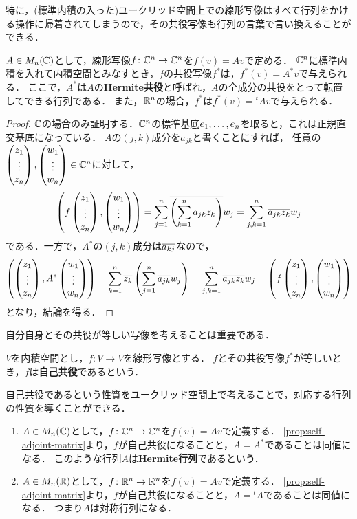 特に，(標準内積の入った)ユークリッド空間上での線形写像はすべて行列をかける操作に帰着されてしまうので，その共役写像も行列の言葉で言い換えることができる．
\begin{prop}\label{prop:self-adjoint-matrix}
  $A \in M_n(\mathbb{C})$として，線形写像$f \colon \mathbb{C}^n \to \mathbb{C}^n$を$f(v) = Av$で定める．
  $\mathbb{C}^n$に標準内積を入れて内積空間とみなすとき，$f$の共役写像$f^\ast$は，$f^\ast(v) = A^\ast v$で与えられる．
  ここで，$A^\ast$は$A$の\textbf{Hermite共役}と呼ばれ，$A$の全成分の共役をとって転置してできる行列である．
  また，$\mathbb{R}^n$の場合，$f^\ast$は$f^\ast(v) = {}^tA v$で与えられる．
\end{prop}
\begin{proof}
$\mathbb{C}$の場合のみ証明する．$\mathbb{C}^n$の標準基底$e_{1},\dots,e_{n}$を取ると，これは正規直交基底になっている．
$A$の$(j,k)$成分を$a_{jk}$と書くことにすれば，
任意の$\begin{pmatrix} z_{1} \\ \vdots \\ z_{n} \end{pmatrix}, \begin{pmatrix} w_{1} \\ \vdots \\ w_{n} \end{pmatrix} \in \mathbb{C}^n$に対して，
\[
  \left( f \begin{pmatrix} z_{1} \\ \vdots \\ z_{n} \end{pmatrix}, \begin{pmatrix} w_{1} \\ \vdots \\ w_{n} \end{pmatrix} \right) = \sum_{j=1}^{n} \overline{\left( \sum_{k=1}^{n} a_{jk}z_k\right)} w_j 
  = \sum_{j,k=1}^n \overline{a_{jk}}\overline{z_k}w_j
\]
である．一方で，$A^\ast$の$(j,k)$成分は$\overline{a_{kj}}$なので，
\[
  \left( \begin{pmatrix} z_{1} \\ \vdots \\ z_{n} \end{pmatrix}, A^\ast\begin{pmatrix} w_{1} \\ \vdots \\ w_{n} \end{pmatrix} \right) 
  = \sum_{k=1}^n \overline{z_k} \left( \sum_{j=1}^n \overline{a_{jk}} w_j \right) 
  = \sum_{j,k=1}^n \overline{a_{jk}}\overline{z_k}w_j
  = \left( f \begin{pmatrix} z_{1} \\ \vdots \\ z_{n} \end{pmatrix}, \begin{pmatrix} w_{1} \\ \vdots \\ w_{n} \end{pmatrix} \right) 
\]
となり，結論を得る．
\end{proof}
自分自身とその共役が等しい写像を考えることは重要である．
\begin{dfn}
$V$を内積空間とし，$f \colon V \to V$を線形写像とする．
$f$とその共役写像$f^\ast$が等しいとき，$f$は\textbf{自己共役}であるという．
\end{dfn}
自己共役であるという性質をユークリッド空間上で考えることで，対応する行列の性質を導くことができる．
\begin{example}
\begin{enumerate}
  \item $A \in M_n(\mathbb{C})$として，$f \colon \mathbb{C}^n \to \mathbb{C}^n$を$f(v)=Av$で定義する．
  \cref{prop:self-adjoint-matrix}より，$f$が自己共役になることと，$A=A^\ast$であることは同値になる．
  このような行列$A$は\textbf{Hermite行列}であるという．
  \item $A \in M_n(\mathbb{R})$として，$f \colon \mathbb{R}^n \to \mathbb{R}^n$を$f(v)=Av$で定義する．
  \cref{prop:self-adjoint-matrix}より，$f$が自己共役になることと，$A={}^t A$であることは同値になる．
  つまり$A$は対称行列になる．
\end{enumerate}
\end{example}
